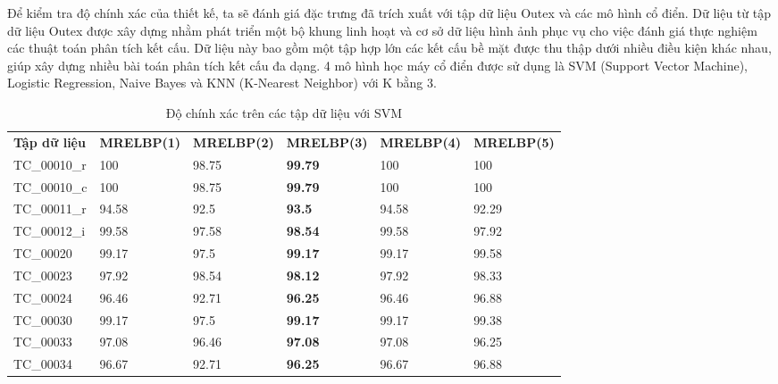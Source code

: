 Để kiểm tra độ chính xác của thiết kế, ta sẽ đánh giá đặc trưng đã trích xuất với tập dữ liệu Outex\cite{outex} và các mô hình cổ điển. Dữ liệu từ tập dữ liệu Outex được xây dựng nhằm phát triển một bộ khung linh hoạt và cơ sở dữ liệu hình ảnh phục vụ cho việc đánh giá thực nghiệm các thuật toán phân tích kết cấu. Dữ liệu này bao gồm một tập hợp lớn các kết cấu bề mặt được thu thập dưới nhiều điều kiện khác nhau, giúp xây dựng nhiều bài toán phân tích kết cấu đa dạng. 4 mô hình học máy cổ điển được sử dụng là SVM (Support Vector Machine), Logistic Regression, Naive Bayes và KNN (K-Nearest Neighbor) với K bằng 3. 



\begin{table}[!ht]
	\centering
	\renewcommand{\arraystretch}{1.3}
		\caption{Độ chính xác trên các tập dữ liệu với SVM}
	\begin{tabular}{|p{2.5cm} p{2.5cm} p{2.5cm} p{2.5cm} p{2.5cm} p{2.5cm}|}
		\hline
		\rowcolor{gray!30}
		\textbf{Tập dữ liệu} & \textbf{MRELBP(1)}  & \textbf{MRELBP(2)} & \textbf{MRELBP(3) } &  \textbf{MRELBP(4)} & \textbf{MRELBP(5)}  \\
		TC\_00010\_r & 100 &98.75 & \textbf{99.79 }& 100 & 100
		\\ \hline
		TC\_00010\_c & 100 & 98.75 & \textbf{99.79} & 100 & 100
		\\ \hline
		TC\_00011\_r & 94.58 &92.5 & \textbf{93.5} & 94.58 & 92.29
		\\ \hline
		TC\_00012\_i & 99.58 & 97.58 & \textbf{98.54} & 99.58 & 97.92
		\\ \hline
		TC\_00020 & 99.17 & 97.5 & \textbf{99.17} & 99.17 & 99.58
		\\ \hline
		TC\_00023 & 97.92 &98.54 & \textbf{98.12} & 97.92 & 98.33
		\\ \hline
		TC\_00024 & 96.46 & 92.71 & \textbf{96.25} & 96.46 & 96.88
		\\ \hline
		TC\_00030 & 99.17 & 97.5 & \textbf{99.17} & 99.17 & 99.38
		\\ \hline
		TC\_00033 & 97.08 & 96.46 & \textbf{97.08} & 97.08 & 96.25
		\\ \hline
		TC\_00034 & 96.67 & 92.71 & \textbf{96.25} & 96.67 & 96.88
		\\ \hline
	\end{tabular}

	\label{tab:svm}
\end{table}

